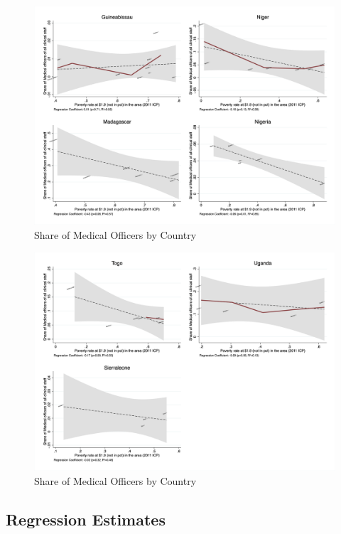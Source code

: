 \documentclass{article}                 %
\begin{document}
			\begin{figure}[H] 
				\centering
				\caption{Share of Medical Officers by Country} 
				\includegraphics[width=\textwidth]{"../Output/Final/poverty_fl_2_medoff"}
			\end{figure}
			
			\begin{figure}[H] 
				\centering
				\caption{Share of Medical Officers by Country} 
				\includegraphics[width=\textwidth]{"../Output/Final/poverty_fl_3_medoff"}
			\end{figure}
		
		\vspace{10cm}
		
	\subsection*{Regression Estimates}	
		
\end{document}
